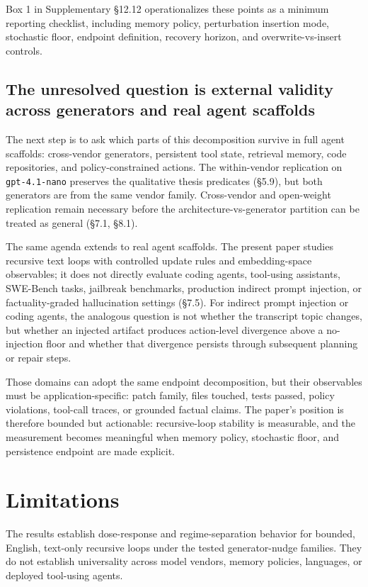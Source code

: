 \documentclass{article}
\theoremstyle{plain}
\theoremstyle{definition}
\begin{document}
Box 1 in Supplementary §12.12 operationalizes these points as a minimum reporting checklist, including memory policy, perturbation insertion mode, stochastic floor, endpoint definition, recovery horizon, and overwrite-vs-insert controls.

\subsection{The unresolved question is external validity across generators and real agent scaffolds}

The next step is to ask which parts of this decomposition survive in full agent scaffolds: cross-vendor generators, persistent tool state, retrieval memory, code repositories, and policy-constrained actions. The within-vendor replication on \texttt{gpt-4.1-nano} preserves the qualitative thesis predicates (§5.9), but both generators are from the same vendor family. Cross-vendor and open-weight replication remain necessary before the architecture-vs-generator partition can be treated as general (§7.1, §8.1).

The same agenda extends to real agent scaffolds. The present paper studies recursive text loops with controlled update rules and embedding-space observables; it does not directly evaluate coding agents, tool-using assistants, SWE-Bench tasks, jailbreak benchmarks, production indirect prompt injection, or factuality-graded hallucination settings (§7.5). For indirect prompt injection or coding agents, the analogous question is not whether the transcript topic changes, but whether an injected artifact produces action-level divergence above a no-injection floor and whether that divergence persists through subsequent planning or repair steps.

Those domains can adopt the same endpoint decomposition, but their observables must be application-specific: patch family, files touched, tests passed, policy violations, tool-call traces, or grounded factual claims. The paper's position is therefore bounded but actionable: recursive-loop stability is measurable, and the measurement becomes meaningful when memory policy, stochastic floor, and persistence endpoint are made explicit.

\section{Limitations}

The results establish dose-response and regime-separation behavior for bounded, English, text-only recursive loops under the tested generator-nudge families. They do not establish universality across model vendors, memory policies, languages, or deployed tool-using agents.
\end{document}
